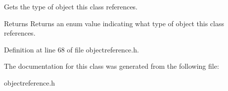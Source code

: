 Gets the type of object this class references. 

\begin{DoxyReturn}{Returns}
Returns an enum value indicating what type of object this class references. 
\end{DoxyReturn}


Definition at line 68 of file objectreference.h.



The documentation for this class was generated from the following file:\begin{DoxyCompactItemize}
\item 
objectreference.h\end{DoxyCompactItemize}
